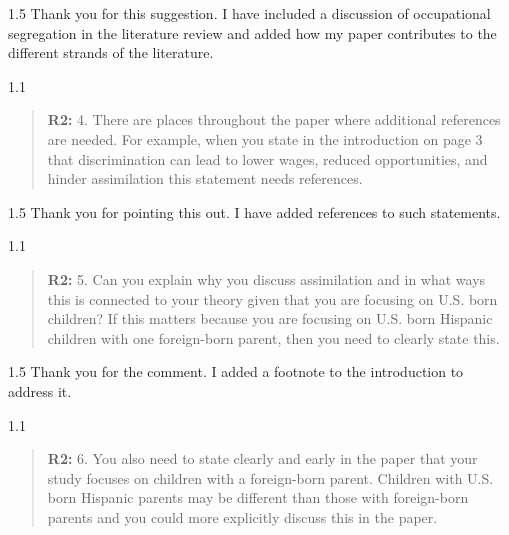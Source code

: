 \documentclass[12pt,english]{article}
\newcommand{\rrquote}{1.1}
\newcommand{\rrxspc}{1.5}
\begin{document}
\begin{refsection}
        \begin{spacing}{\rrxspc}
            Thank you for this suggestion. I have included a discussion of occupational segregation in the literature review and added how my paper contributes to the different strands of the literature.
    \end{spacing}

    \begin{spacing}{\rrquote}
        \begin{quotation}
        \textbf{R2: } 4. There are places throughout the paper where additional references are needed. For example, when you state in the introduction on page 3 that discrimination can lead to lower wages, reduced opportunities, and hinder assimilation this statement needs references.
        \end{quotation}
        \end{spacing}
        
        \begin{spacing}{\rrxspc}
            Thank you for pointing this out. I have added references to such statements. 
    \end{spacing}

    \begin{spacing}{\rrquote}
        \begin{quotation}
        \textbf{R2: } 5. Can you explain why you discuss assimilation and in what ways this is connected to your theory given that you are focusing on U.S. born children? If this matters because you are focusing on U.S. born Hispanic children with one foreign-born parent, then you need to clearly state this.
        \end{quotation}
        \end{spacing}
        
        \begin{spacing}{\rrxspc}
            Thank you for the comment. I added a footnote to the introduction to address it. 
    \end{spacing}

    \begin{spacing}{\rrquote}
        \begin{quotation}
        \textbf{R2: } 6. You also need to state clearly and early in the paper that your study focuses on children with a foreign-born parent. Children with U.S. born Hispanic parents may be different than those with foreign-born parents and you could more explicitly discuss this in the paper.
        \end{quotation}
        \end{spacing}
        

\end{refsection}
\end{document}
